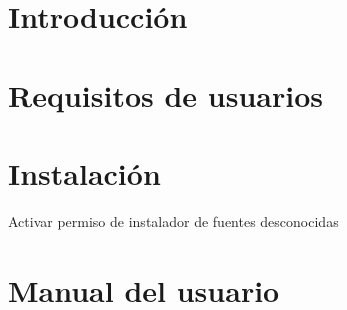 \section{Introducción}
\section{Requisitos de usuarios}
\section{Instalación}
Activar permiso de instalador de fuentes desconocidas
\section{Manual del usuario}
